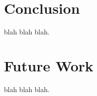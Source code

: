 \section{Conclusion}\label{sec:conclusion}

blah blah blah.

\section{Future Work}\label{sec:future-work}

blah blah blah.
